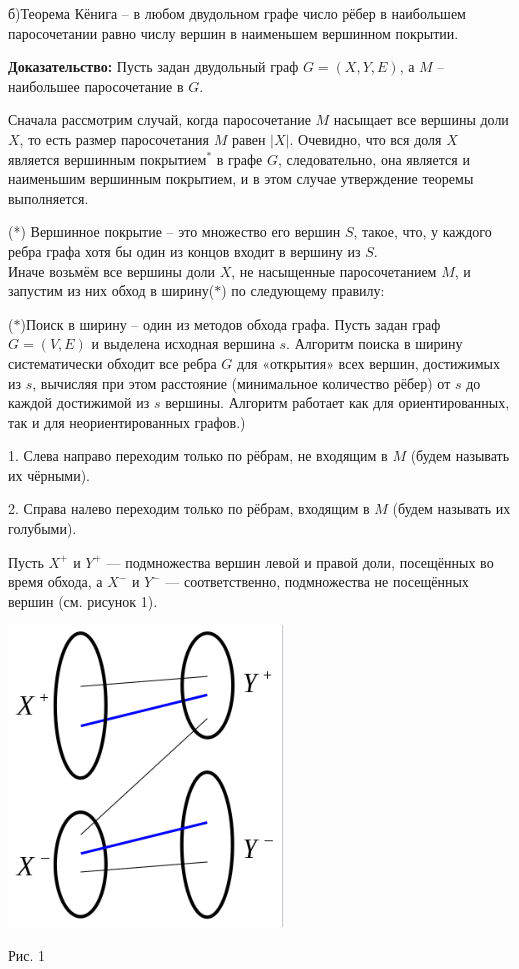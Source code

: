 \documentclass[a4paper,12pt]{article} %
\begin{document}
\newpage
б)Теорема Кёнига -- в любом двудольном графе число рёбер в наибольшем паросочетании равно числу вершин в наименьшем вершинном покрытии.



{\bf Доказательство:} Пусть задан двудольный граф $ G=(X,Y,E)$, а   
\hspace{66mm}$M$ -- наибольшее паросочетание в $G$.

Сначала рассмотрим случай, когда паросочетание $M$ насыщает все вершины доли $X$, то есть размер паросочетания $M$ равен $|X|$. Очевидно, что вся доля $X$ является вершинным покрытием$^{*}$ в графе $G$, следовательно, она является и наименьшим вершинным покрытием, и в этом случае утверждение теоремы выполняется.

(*) Вершинное покрытие -- это множество его вершин $S$, такое, что, у каждого ребра графа хотя бы один из концов входит в вершину из $S$.\\

Иначе возьмём все вершины доли $X$, не насыщенные паросочетанием $M$, и запустим из них обход в ширину($\ast$) по следующему правилу:


($\ast$)Поиск в ширину -- один из методов обхода графа. Пусть задан граф $G=(V,E)$ и выделена исходная вершина $s$. Алгоритм поиска в ширину систематически обходит все ребра $G$ для «открытия» всех вершин, достижимых из $s$, вычисляя при этом расстояние (минимальное количество рёбер) от $s$ до каждой достижимой из $s$ вершины. Алгоритм работает как для ориентированных, так и для неориентированных графов.)


1. Слева направо переходим только по рёбрам, не входящим в $M$ (будем называть их чёрными).

2. Справа налево переходим только по рёбрам, входящим в $M$ (будем называть их голубыми).

Пусть $X^{+}$ и $Y^{+}$ — подмножества вершин левой и правой доли, посещённых во время обхода, а $X^{-}$ и $ Y^{-}$ — соответственно, подмножества не посещённых вершин (см. рисунок 1).\\

\begin{center}
\includegraphics[scale=1]{6 2}

Рис. 1
\end{center}
\end{document}

